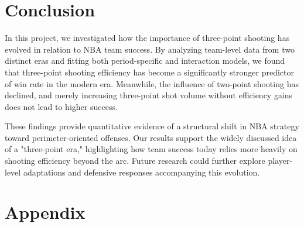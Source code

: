 \documentclass[11pt, a4paper]{article} %
\begin{document}

\section{Conclusion}
In this project, we investigated how the importance of three-point shooting has evolved in relation to NBA team success. 
By analyzing team-level data from two distinct eras and fitting both period-specific and interaction models, we found that three-point 
shooting efficiency has become a significantly stronger predictor of win rate in the modern era. Meanwhile, the influence of two-point 
shooting has declined, and merely increasing three-point shot volume without efficiency gains does not lead to higher success.

These findings provide quantitative evidence of a structural shift in NBA strategy toward perimeter-oriented offenses. Our results support 
the widely discussed idea of a "three-point era," highlighting how team success today relies more heavily on shooting efficiency beyond the 
arc. Future research could further explore player-level adaptations and defensive responses accompanying this evolution.

\newpage %
%



\newpage
{} %

\section*{Appendix}

\end{document}
